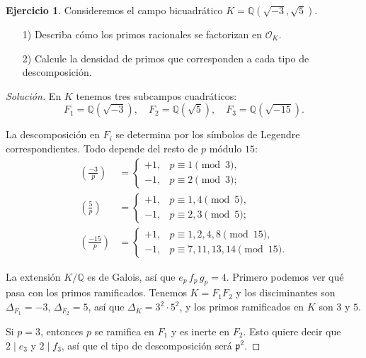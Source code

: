 \documentclass{article}
\newcounter{tarea}
\theoremstyle{definition}
\newtheorem{ejercicio}{Ejercicio}[tarea]
\newenvironment{solucion}{\begin{proof}[Solución]}{\end{proof}}
\newcommand{\QQ}{\mathbb{Q}}
\renewcommand{\O}{\mathcal{O}}
\newcommand{\legendre}[2]{\left(\frac{#1}{#2}\right)}
\begin{document}
\begin{ejercicio}
  Consideremos el campo bicuadrático $K = \QQ (\sqrt{-3}, \sqrt{5})$.

  \begin{enumerate}
  \item[1)] Describa cómo los primos racionales se factorizan en $\O_K$.

  \item[2)] Calcule la densidad de primos que corresponden a cada tipo de
    descomposición.
  \end{enumerate}

  \ifdefined\solutions
  \begin{solucion}
    En $K$ tenemos tres subcampos cuadráticos:
    \[ F_1 = \QQ (\sqrt{-3}), \quad
    F_2 = \QQ (\sqrt{5}), \quad
    F_3 = \QQ (\sqrt{-15}). \]

    La descomposición en $F_i$ se determina por los símbolos de Legendre
    correspondientes. Todo depende del resto de $p$ módulo $15$:
    \begin{align*}
      \legendre{-3}{p} & = \begin{cases}
        +1, & p\equiv 1 \pmod{3},\\
        -1, & p\equiv 2 \pmod{3};
      \end{cases}\\
      \legendre{5}{p} & = \begin{cases}
        +1, & p\equiv 1,4 \pmod{5},\\
        -1, & p\equiv 2,3 \pmod{5};
      \end{cases}\\
      \legendre{-15}{p} & = \begin{cases}
        +1, & p\equiv 1,2,4,8 \pmod{15},\\
        -1, & p\equiv 7,11,13,14 \pmod{15}.
      \end{cases}
    \end{align*}

    La extensión $K/\QQ$ es de Galois, así que $e_p\,f_p\,g_p = 4$. Primero
    podemos ver qué pasa con los primos ramificados. Tenemos $K = F_1 F_2$
    y los disciminantes son $\Delta_{F_1} = -3$, $\Delta_{F_2} = 5$, así que
    $\Delta_K = 3^2\cdot 5^2$, y los primos ramificados en $K$ son $3$ y $5$.

    Si $p = 3$, entonces $p$ se ramifica en $F_1$ y es inerte en $F_2$. Esto
    quiere decir que $2 \mid e_3$ y $2 \mid f_3$, así que el tipo de
    descomposición será $\mathfrak{p}^2$.


\end{solucion}
\end{ejercicio}
\end{document}
